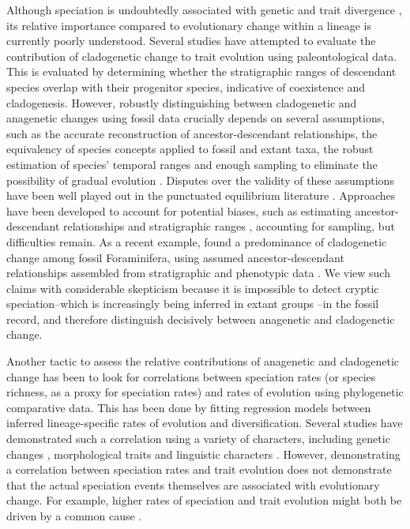 Although speciation is undoubtedly associated with genetic and trait divergence \citep[][and references therein]{Nosil2012}, its relative importance compared to evolutionary change within a lineage is currently poorly understood. Several studies have attempted to evaluate the contribution of cladogenetic change to trait evolution \citep{WagnerErwin1995, JC1999, Aze2011, Strotz2013} using paleontological data. This is evaluated by determining whether the stratigraphic ranges of descendant species overlap with their progenitor species, indicative of coexistence and cladogenesis. However, robustly distinguishing between cladogenetic and anagenetic changes using fossil data crucially depends on several assumptions, such as the accurate reconstruction of ancestor-descendant relationships, the equivalency of species concepts applied to fossil and extant taxa, the robust estimation of species' temporal ranges and enough sampling to eliminate the possibility of gradual evolution \citep{JC1999}. Disputes over the validity of these assumptions have been well played out in the punctuated equilibrium literature \citep[e.g., the Turkana Basin molluscs,][]{Williamson1981, Fryer1983, VanBocxlaer2008}. Approaches have been developed to account for potential biases, such as estimating ancestor-descendant relationships \citep{Marshall1995, Foote1996} and stratigraphic ranges \citep{Marshall1990, Marshall1994, Marshall1997, Wagner2000}, accounting for sampling, but difficulties remain.  As a recent example, \citet{Strotz2013} found a predominance of cladogenetic change among fossil Foraminifera, using assumed ancestor-descendant relationships assembled from stratigraphic and phenotypic data \citep{Aze2011}. We view such claims with considerable skepticism because it is impossible to detect cryptic speciation--which is increasingly being inferred in extant groups \citep{Fujita2012}--in the fossil record, and therefore distinguish decisively between anagenetic and cladogenetic change.

Another tactic to assess the relative contributions of anagenetic and cladogenetic change has been to look for correlations between speciation rates (or species richness, as a proxy for speciation rates) and rates of evolution using phylogenetic comparative data. This has been done by fitting regression models between inferred lineage-specific rates of evolution and diversification. Several studies have demonstrated such a correlation using a variety of characters, including genetic changes \citep{Webster2003, Pagel2006, VendittiPagel2010}, morphological traits \citep{Ricklefs2004, Adams2009, RaboskyAdams2012, Rabosky2013} and linguistic characters \citep{Atkinson2008}. However, demonstrating a correlation between speciation rates and trait evolution does not demonstrate that the actual speciation events themselves are associated with evolutionary change. For example, higher rates of speciation and trait evolution might both be driven by a common cause \citep[][see below, \textsc{box 2},]{Rabosky2012}.


